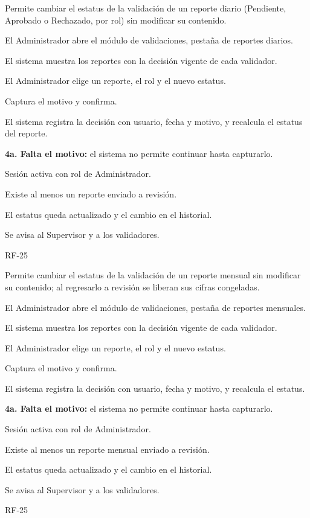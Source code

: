 {Permite cambiar el estatus de la validación de un reporte diario (Pendiente, Aprobado o Rechazado, por rol) sin modificar su contenido.}
{\item El Administrador abre el módulo de validaciones, pestaña de reportes diarios.
 \item El sistema muestra los reportes con la decisión vigente de cada validador.
 \item El Administrador elige un reporte, el rol y el nuevo estatus.
 \item Captura el motivo y confirma.
 \item El sistema registra la decisión con usuario, fecha y motivo, y recalcula el estatus del reporte.}
{\item \textbf{4a. Falta el motivo:} el sistema no permite continuar hasta capturarlo.}
{\item Sesión activa con rol de Administrador.
 \item Existe al menos un reporte enviado a revisión.}
{\item El estatus queda actualizado y el cambio en el historial.
 \item Se avisa al Supervisor y a los validadores.}
{RF-25}

{Permite cambiar el estatus de la validación de un reporte mensual sin modificar su contenido; al regresarlo a revisión se liberan sus cifras congeladas.}
{\item El Administrador abre el módulo de validaciones, pestaña de reportes mensuales.
 \item El sistema muestra los reportes con la decisión vigente de cada validador.
 \item El Administrador elige un reporte, el rol y el nuevo estatus.
 \item Captura el motivo y confirma.
 \item El sistema registra la decisión con usuario, fecha y motivo, y recalcula el estatus.}
{\item \textbf{4a. Falta el motivo:} el sistema no permite continuar hasta capturarlo.}
{\item Sesión activa con rol de Administrador.
 \item Existe al menos un reporte mensual enviado a revisión.}
{\item El estatus queda actualizado y el cambio en el historial.
 \item Se avisa al Supervisor y a los validadores.}
{RF-25}

